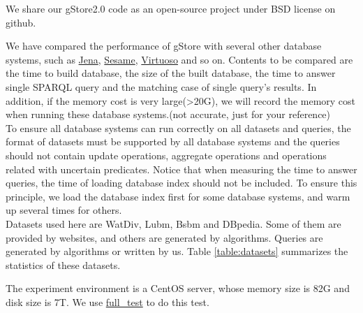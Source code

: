 \documentclass[titlepage, a4paper, 12pt]{article}
\begin{document}
We share our gStore2.0 code as an open-source project under BSD license
on github.

\clearpage



We have compared the performance of gStore with several other database
systems, such as \href{http://jena.apache.org/}{Jena},
\href{http://www.rdf4j.org/}{Sesame},
\href{http://virtuoso.openlinksw.com/}{Virtuoso} and so on. Contents to
be compared are the time to build database, the size of the built
database, the time to answer single SPARQL query and the matching case
of single query's results. In addition, if the memory cost is very
large(\textgreater{}20G), we will record the memory cost when running
these database systems.(not accurate, just for your reference) \\

To ensure all database systems can run correctly on all datasets and
queries, the format of datasets must be supported by all database
systems and the queries should not contain update operations, aggregate
operations and operations related with uncertain predicates. Notice that
when measuring the time to answer queries, the time of loading database
index should not be included. To ensure this principle, we load the
database index first for some database systems, and warm up several
times for others. \\

Datasets used here are WatDiv, Lubm, Bsbm and DBpedia. Some of them are
provided by websites, and others are generated by algorithms. Queries
are generated by algorithms or written by us. Table \ref{table:datasets} summarizes the statistics of these datasets.

The experiment environment is a CentOS server, whose memory size is 82G
and disk size is 7T. We use
\href{run:../../test/full_test.sh}{full\_test}
to do this test.
\end{document}
